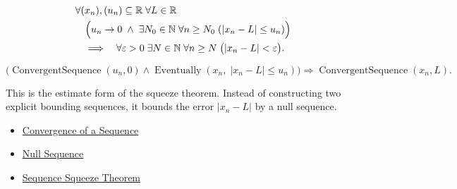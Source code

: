 \begin{remark*}
\[
\begin{aligned}
&\forall (x_n),(u_n)\subseteq\mathbb{R}\;\forall L\in\mathbb{R}\\
&\quad\Bigl(
  u_n\to 0
  \;\land\;
  \exists N_0\in\mathbb{N}\;\forall n\ge N_0\;(|x_n-L|\le u_n)
\Bigr)\\
&\quad\Longrightarrow\quad
\forall \varepsilon>0\;\exists N\in\mathbb{N}\;\forall n\ge N\;
\bigl(|x_n-L|<\varepsilon\bigr).
\end{aligned}
\]
\end{remark*}

\begin{remark*}
\[
\bigl(
\operatorname{ConvergentSequence}(u_n,0)
\land
\operatorname{Eventually}(x_n,\;|x_n-L|\le u_n)
\bigr)
\Longrightarrow
\operatorname{ConvergentSequence}(x_n,L).
\]
\end{remark*}

\begin{remark*}[Interpretation]
This is the estimate form of the squeeze theorem. Instead of constructing
two explicit bounding sequences, it bounds the error $|x_n-L|$ by a null
sequence.
\end{remark*}

\begin{remark*}[Dependencies]
\begin{itemize}
  \item \hyperref[def:convergent-sequence]{Convergence of a Sequence}
  \item \hyperref[def:null-sequence]{Null Sequence}
  \item \hyperref[thm:sequence-squeeze-theorem]{Sequence Squeeze Theorem}
\end{itemize}
\end{remark*}



